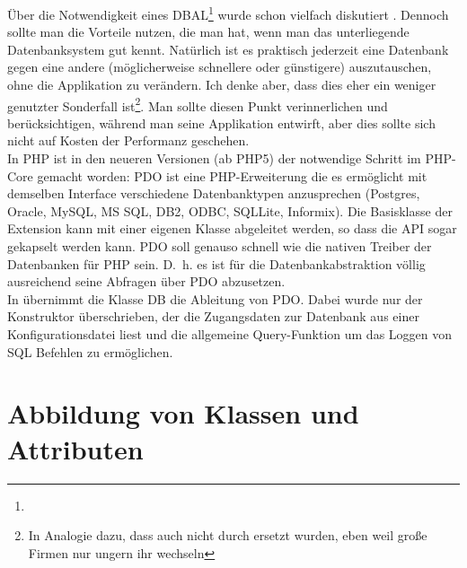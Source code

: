 Über die Notwendigkeit eines DBAL\footnote{} wurde schon vielfach diskutiert \cite{ambler-persistence-layer}. Dennoch sollte man die Vorteile nutzen, die man hat, wenn man das unterliegende Datenbanksystem gut kennt. Natürlich ist es praktisch jederzeit eine Datenbank gegen eine andere (möglicherweise schnellere oder günstigere) auszutauschen, ohne die Applikation zu verändern. Ich denke aber, dass dies eher ein weniger genutzter Sonderfall ist\footnote{In Analogie dazu, dass \RDBMSs auch nicht durch \ODBMSs ersetzt wurden, eben weil große Firmen nur ungern ihr \DBMS wechseln}. Man sollte diesen Punkt verinnerlichen und berücksichtigen, während man seine Applikation entwirft, aber dies sollte sich nicht auf Kosten der Performanz geschehen. \\
In PHP ist in den neueren Versionen (ab PHP5) der notwendige Schritt im PHP-Core gemacht worden: PDO ist eine PHP-Erweiterung die es ermöglicht mit demselben Interface verschiedene Datenbanktypen anzusprechen (Postgres, Oracle, MySQL, MS SQL, DB2, ODBC, SQLLite, Informix). Die Basisklasse der Extension kann mit einer eigenen Klasse abgeleitet werden, so dass die API sogar gekapselt werden kann. PDO soll genauso schnell wie die nativen Treiber der Datenbanken für PHP sein. D.~h. es ist für die Datenbankabstraktion völlig ausreichend seine Abfragen über PDO abzusetzen. \\ In \PSCORM übernimmt die Klasse DB die Ableitung von PDO. Dabei wurde nur der Konstruktor überschrieben, der die Zugangsdaten zur Datenbank aus einer Konfigurationsdatei liest und die allgemeine Query-Funktion um das Loggen von SQL Befehlen zu ermöglichen.

\section{Abbildung von Klassen und Attributen}

